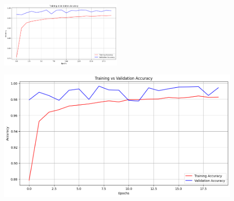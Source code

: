 \begin{multicols}{2}
\vspace{0.8cm}

\includegraphics[width=0.45\textwidth]{Assets/validation_accuracy/vgg16.png}

\vspace{0.8cm}

\end{multicols}

\newpage

\includegraphics[width=0.9\textwidth]{Assets/validation_accuracy/CONVNEXT.png}




